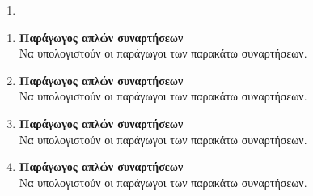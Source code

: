 \documentclass[twoside,nofonts,internet]{askhseis}
\begin{document}
\begin{enumerate}
\item 
\end{enumerate}
\twocolkentro{\askhseis}
\begin{enumerate}
\item \textbf{Παράγωγος απλών συναρτήσεων}\\
Να υπολογιστούν οι παράγωγοι των παρακάτω συναρτήσεων.
\begin{multicols}{2}
\end{multicols}
\item \textbf{Παράγωγος απλών συναρτήσεων}\\
Να υπολογιστούν οι παράγωγοι των παρακάτω συναρτήσεων.
\begin{multicols}{2}
\end{multicols}
\item \textbf{Παράγωγος απλών συναρτήσεων}\\
Να υπολογιστούν οι παράγωγοι των παρακάτω συναρτήσεων.
\begin{multicols}{2}
\end{multicols}
\item \textbf{Παράγωγος απλών συναρτήσεων}\\
Να υπολογιστούν οι παράγωγοι των παρακάτω συναρτήσεων.
\begin{multicols}{2}

\end{multicols}
\end{enumerate}
\end{document}
